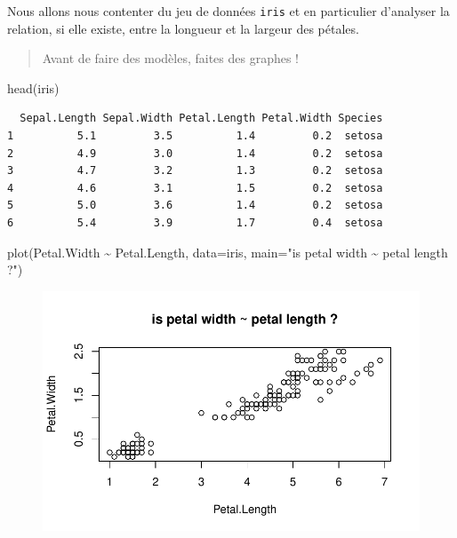\documentclass[
  letterpaper,
  DIV=11,
  numbers=noendperiod]{scrreprt}
\newenvironment{Shaded}{\begin{snugshade}}{\end{snugshade}}
\newcommand{\AttributeTok}[1]{\textcolor[rgb]{0.40,0.45,0.13}{#1}}
\newcommand{\FunctionTok}[1]{\textcolor[rgb]{0.28,0.35,0.67}{#1}}
\newcommand{\NormalTok}[1]{\textcolor[rgb]{0.00,0.23,0.31}{#1}}
\newcommand{\SpecialCharTok}[1]{\textcolor[rgb]{0.37,0.37,0.37}{#1}}
\newcommand{\StringTok}[1]{\textcolor[rgb]{0.13,0.47,0.30}{#1}}
\begin{document}
Nous allons nous contenter du jeu de données \texttt{iris} et en
particulier d'analyser la relation, si elle existe, entre la longueur et
la largeur des pétales.

\begin{quote}
Avant de faire des modèles, faites des graphes !
\end{quote}

\begin{Shaded}
\begin{Highlighting}[]
\FunctionTok{head}\NormalTok{(iris)}
\end{Highlighting}
\end{Shaded}

\begin{verbatim}
  Sepal.Length Sepal.Width Petal.Length Petal.Width Species
1          5.1         3.5          1.4         0.2  setosa
2          4.9         3.0          1.4         0.2  setosa
3          4.7         3.2          1.3         0.2  setosa
4          4.6         3.1          1.5         0.2  setosa
5          5.0         3.6          1.4         0.2  setosa
6          5.4         3.9          1.7         0.4  setosa
\end{verbatim}

\begin{Shaded}
\begin{Highlighting}[]
\FunctionTok{plot}\NormalTok{(Petal.Width }\SpecialCharTok{\textasciitilde{}}\NormalTok{ Petal.Length, }\AttributeTok{data=}\NormalTok{iris, }
     \AttributeTok{main=}\StringTok{"is petal width \textasciitilde{} petal length ?"}\NormalTok{)}
\end{Highlighting}
\end{Shaded}

\begin{figure}[H]

{\centering \includegraphics{modelling_files/figure-pdf/unnamed-chunk-1-1.pdf}

}

\end{figure}
\end{document}
